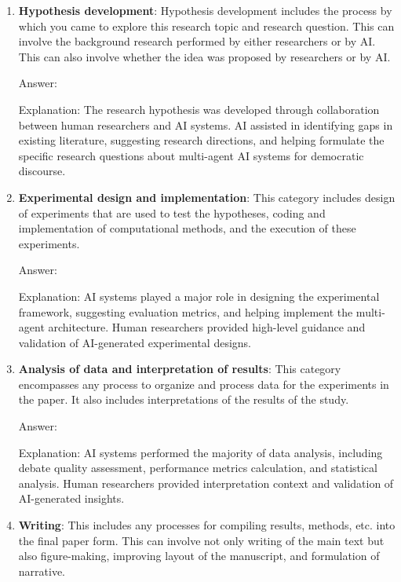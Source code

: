 \documentclass[11pt]{article}
\begin{document}
\begin{enumerate}
    \item \textbf{Hypothesis development}: Hypothesis development includes the process by which you came to explore this research topic and research question. This can involve the background research performed by either researchers or by AI. This can also involve whether the idea was proposed by researchers or by AI.
  
    Answer: \involvementC{} 
     
    Explanation: The research hypothesis was developed through collaboration between human researchers and AI systems. AI assisted in identifying gaps in existing literature, suggesting research directions, and helping formulate the specific research questions about multi-agent AI systems for democratic discourse.
     
    \item \textbf{Experimental design and implementation}: This category includes design of experiments that are used to test the hypotheses, coding and implementation of computational methods, and the execution of these experiments.
  
    Answer: \involvementC{} 
     
    Explanation: AI systems played a major role in designing the experimental framework, suggesting evaluation metrics, and helping implement the multi-agent architecture. Human researchers provided high-level guidance and validation of AI-generated experimental designs.
     
    \item \textbf{Analysis of data and interpretation of results}: This category encompasses any process to organize and process data for the experiments in the paper. It also includes interpretations of the results of the study.
  
    Answer: \involvementC{} 
     
    Explanation: AI systems performed the majority of data analysis, including debate quality assessment, performance metrics calculation, and statistical analysis. Human researchers provided interpretation context and validation of AI-generated insights.
     
    \item \textbf{Writing}: This includes any processes for compiling results, methods, etc. into the final paper form. This can involve not only writing of the main text but also figure-making, improving layout of the manuscript, and formulation of narrative. 


\end{enumerate}
\end{document}
